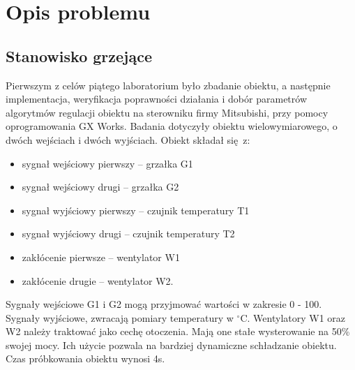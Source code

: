 \chapter{Opis problemu}
\section{Stanowisko grzejące}
\label{sec:grzjace}
Pierwszym z celów piątego laboratorium było zbadanie obiektu, a następnie
implementacja, weryfikacja poprawności działania i dobór parametrów algorytmów
regulacji obiektu na sterowniku firmy Mitsubishi, przy pomocy oprogramowania
GX Works.
Badania dotyczyły obiektu wielowymiarowego, o dwóch wejściach
i dwóch wyjściach. Obiekt składał się z:
\begin{itemize}
  \item sygnał wejściowy pierwszy -- grzałka G1
  \item sygnał wejściowy drugi -- grzałka G2
  \item sygnał wyjściowy pierwszy -- czujnik temperatury T1
  \item sygnał wyjściowy drugi -- czujnik temperatury T2
  \item zakłócenie pierwsze -- wentylator W1
  \item zakłócenie drugie -- wentylator W2.
\end{itemize}
Sygnały wejściowe G1 i G2 mogą przyjmować wartości w zakresie 0 - 100.
Sygnały wyjściowe, zwracają pomiary temperatury w $^\circ$C. Wentylatory
W1 oraz W2 należy traktować jako cechę otoczenia. Mają one stałe wysterowanie
na 50\% swojej mocy. Ich użycie pozwala na bardziej dynamiczne schładzanie
obiektu. Czas próbkowania obiektu wynosi 4s.
